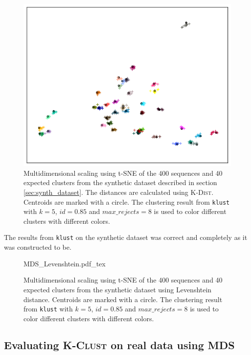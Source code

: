 \begin{figure}[H]
  \includegraphics[width=\textwidth]{graphics/MDS_t-SNE_synth_silva_400.png}
  \caption{Multidimensional scaling using t-SNE of the 400 sequences and
    40 expected clusters from the synthetic dataset described in section
    \ref{sec:synth_dataset}. The distances are calculated using
    \textsc{K-Dist}. Centroids are marked with a circle. The clustering
    result from \texttt{klust} with $k=5$, $id=0.85$ and $max\_rejects=8$ is
    used to color different clusters with different colors.}
  \label{fig:mds_synth}
\end{figure}

The results from \texttt{klust} on the synthetic dataset was correct and
completely as it was constructed to be.


\begin{figure}[H]
  \centering
  \def\svgwidth{\columnwidth}
  {MDS_Levenshtein.pdf_tex}
  \caption{Multidimensional scaling using t-SNE of the 400 sequences and 40
    expected clusters from the synthetic dataset using Levenshtein distance.
    Centroids are marked with a circle. The clustering result from
    \texttt{klust} with $k=5$, $id=0.85$ and $max\_rejects=8$ is used to color
    different clusters with different colors.}
  \label{fig:mds_synth_lev}
\end{figure}




\subsection{Evaluating \textsc{K-Clust} on real data using MDS}
\label{sec:mds_real_data}

